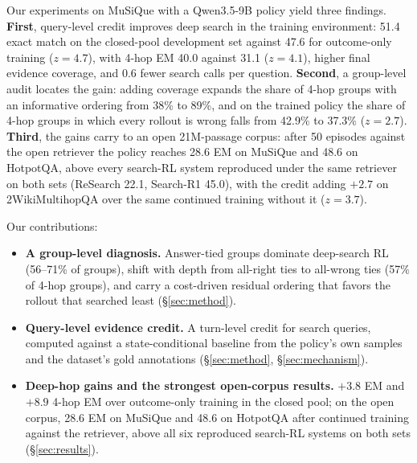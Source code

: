   Our experiments on MuSiQue with a Qwen3.5-9B policy yield three
  findings. \textbf{First}, query-level credit improves deep search in
  the training environment: 51.4 exact match on the closed-pool
  development set against 47.6 for outcome-only training ($z=4.7$), with
  4-hop EM 40.0 against 31.1 ($z=4.1$), higher final evidence coverage,
  and 0.6 fewer search calls per question. \textbf{Second}, a
  group-level audit locates the gain: adding coverage expands the share
  of 4-hop groups with an informative ordering from 38\% to 89\%, and on
  the trained policy the share of 4-hop groups in which every rollout is
  wrong falls from 42.9\% to 37.3\% ($z=2.7$). \textbf{Third}, the gains
  carry to an open 21M-passage corpus: after 50 episodes against the
  open retriever the policy reaches 28.6 EM on MuSiQue and 48.6 on
  HotpotQA, above every search-RL system reproduced under the same
  retriever on both sets (ReSearch 22.1, Search-R1 45.0), with the credit
  adding
  $+2.7$ on 2WikiMultihopQA over the same continued training without it
  ($z=3.7$).

  Our contributions:
  \begin{itemize}\setlength\itemsep{2pt}
  \item \textbf{A group-level diagnosis.} Answer-tied groups dominate
    deep-search RL (56--71\% of groups), shift with depth from all-right
    ties to all-wrong ties (57\% of 4-hop groups), and carry a
    cost-driven residual ordering that favors the rollout that searched
    least (\S\ref{sec:method}).
  \item \textbf{Query-level evidence credit.} A turn-level credit for
    search queries, computed against a state-conditional baseline from
    the policy's own samples and the dataset's gold annotations
    (\S\ref{sec:method}, \S\ref{sec:mechanism}).
  \item \textbf{Deep-hop gains and the strongest open-corpus results.}
    $+3.8$ EM and $+8.9$ 4-hop EM over outcome-only training in the
    closed pool; on the open corpus, 28.6 EM on MuSiQue and 48.6 on
    HotpotQA after continued training against the retriever, above all
    six reproduced search-RL systems on both sets (\S\ref{sec:results}).
  \end{itemize}

